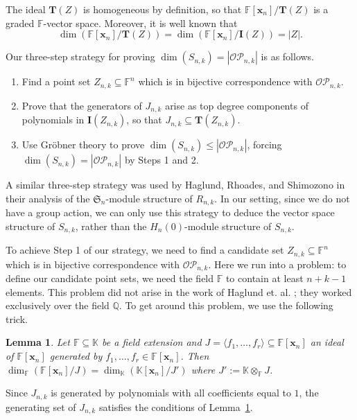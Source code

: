 \documentclass[10pt]{amsart}
\newtheorem{lemma}[theorem]{Lemma}
\theoremstyle{definition}
\newcommand{\symm}{{\mathfrak{S}}}
\newcommand{\QQ}{{\mathbb {Q}}}
\newcommand{\OP}{{\mathcal{OP}}}
\newcommand{\FF}{{\mathbb{F}}}
\newcommand{\KK}{{\mathbb{K}}}
\newcommand{\xx}{{\mathbf {x}}}
\newcommand{\II}{{\mathbf {I}}}
\newcommand{\TT}{{\mathbf {T}}}
\begin{document}
The ideal $\TT(Z)$ is homogeneous by definition, so that ${\FF[\xx_n]} / {\TT(Z)}$ is a graded $\FF$-vector space.
Moreover, it is well known that
\begin{equation}
\dim \left( {\FF[\xx_n]} / {\TT(Z)} \right) = \dim \left( {\FF[\xx_n]} / {\II(Z)} \right) = |Z|.
\end{equation}


Our three-step strategy for proving $\dim(S_{n,k}) = |\OP_{n,k}|$ is as follows.

\begin{enumerate}
\item  Find a  point set $Z_{n,k} \subseteq \FF^n$ which is in bijective correspondence with $\OP_{n,k}$.
\item  Prove that the generators of $J_{n,k}$ arise as top degree components of polynomials in $\II(Z_{n,k})$,
so that $J_{n,k} \subseteq \TT(Z_{n,k})$.
\item Use Gr\"obner theory to prove $\dim(S_{n,k}) \leq |\OP_{n,k}|$, forcing $\dim(S_{n,k}) = |\OP_{n,k}|$
by Steps 1 and 2.
\end{enumerate}

A similar three-step strategy was used by Haglund, Rhoades, and Shimozono \cite{HRS} 
in their analysis of the  $\symm_n$-module structure of $R_{n,k}$.
In our setting, since we do not have a group action, we can only use this strategy to deduce the  vector
space structure of $S_{n,k}$, rather than the $H_n(0)$-module structure of $S_{n,k}$.

To achieve Step 1 of our strategy, we need to find a candidate set $Z_{n,k} \subseteq \FF^n$ which is in bijective
correspondence with $\OP_{n,k}$.  Here we run into a problem:  to define our candidate point sets, we need the 
field $\FF$ to contain at least $n+k-1$ elements.  This problem did not arise in the work of Haglund et. al. \cite{HRS};
they worked exclusively over the field $\QQ$.  To get around this problem, we use the following  trick.

\begin{lemma}
\label{algebraic-swindle}
Let $\FF \subseteq \KK$ be a field extension and $J = \langle f_1, \dots, f_r \rangle \subseteq \FF[\xx_n]$ an ideal of $\FF[\xx_n]$ generated by $f_1, \dots, f_r \in \FF[\xx_n]$.  
Then $\dim_\FF ( {\FF[\xx_n]} / {J} )  = \dim_\KK ( {\KK[\xx_n]} / J' )$ where $J' := {\KK\otimes_\FF J}$.
\end{lemma}

Since $J_{n,k}$ is generated by polynomials with all coefficients equal to $1$, the generating set of $J_{n,k}$ 
satisfies the conditions of Lemma~\ref{algebraic-swindle}.
\end{document}
